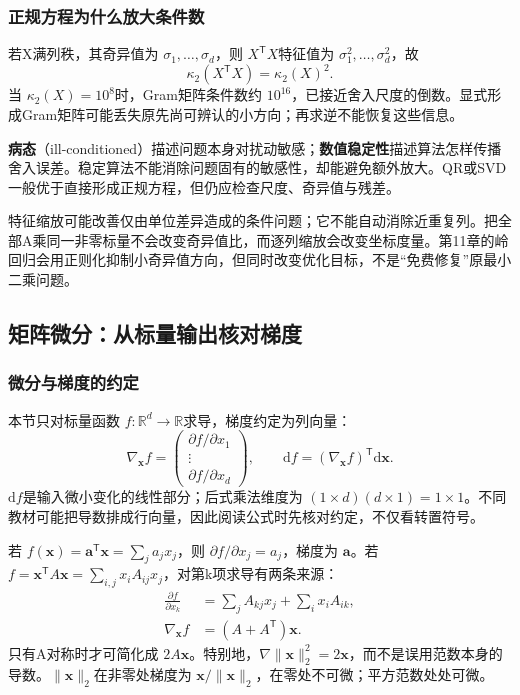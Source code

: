 \documentclass[UTF8,fontset=none,zihao=-4,a4paper]{ctexart}
\newcommand{\term}[1]{\textbf{#1}}
\newcommand{\code}[1]{\texttt{\detokenize{#1}}}
\numberwithin{equation}{section}
\numberwithin{figure}{section}
\begin{document}
\subsubsection{正规方程为什么放大条件数}
若X满列秩，其奇异值为 $\sigma_1,\ldots,\sigma_d$，则 $X^{\mathsf T}X$特征值为 $\sigma_1^2,\ldots,\sigma_d^2$，故
\[
 \kappa_2(X^{\mathsf T}X)=\kappa_2(X)^2.
\]
当 $\kappa_2(X)=10^8$时，Gram矩阵条件数约 $10^{16}$，已接近\code{float64}舍入尺度的倒数。显式形成Gram矩阵可能丢失原先尚可辨认的小方向；再求逆不能恢复这些信息。

\term{病态}（ill-conditioned）描述问题本身对扰动敏感；\term{数值稳定性}描述算法怎样传播舍入误差。稳定算法不能消除问题固有的敏感性，却能避免额外放大。QR或SVD一般优于直接形成正规方程，但仍应检查尺度、奇异值与残差。

特征缩放可能改善仅由单位差异造成的条件问题；它不能自动消除近重复列。把全部A乘同一非零标量不会改变奇异值比，而逐列缩放会改变坐标度量。第11章的岭回归会用正则化抑制小奇异值方向，但同时改变优化目标，不是“免费修复”原最小二乘问题。

\subsection{矩阵微分：从标量输出核对梯度}
\subsubsection{微分与梯度的约定}
本节只对标量函数 $f:\mathbb R^d\to\mathbb R$求导，梯度约定为列向量：
\[
 \nabla_{\symbf x}f=\begin{pmatrix}\partial f/\partial x_1\\\vdots\\\partial f/\partial x_d\end{pmatrix},
 \qquad \mathrm df=(\nabla_{\symbf x}f)^{\mathsf T}\mathrm d\symbf x.
\]
$\mathrm df$是输入微小变化的线性部分；后式乘法维度为 $(1\times d)(d\times1)=1\times1$。不同教材可能把导数排成行向量，因此阅读公式时先核对约定，不仅看转置符号。

若 $f(\symbf x)=\symbf a^{\mathsf T}\symbf x=\sum_j a_jx_j$，则 $\partial f/\partial x_j=a_j$，梯度为 $\symbf a$。若 $f=\symbf x^{\mathsf T}A\symbf x=\sum_{i,j}x_iA_{ij}x_j$，对第k项求导有两条来源：
\begin{align*}
 \frac{\partial f}{\partial x_k}
 &=\sum_jA_{kj}x_j+\sum_i x_iA_{ik},\\
 \nabla_{\symbf x}f&=(A+A^{\mathsf T})\symbf x.
\end{align*}
只有A对称时才可简化成 $2A\symbf x$。特别地，$\nabla\|\symbf x\|_2^2=2\symbf x$，而不是误用范数本身的导数。$\|\symbf x\|_2$在非零处梯度为 $\symbf x/\|\symbf x\|_2$，在零处不可微；平方范数处处可微。
\end{document}
